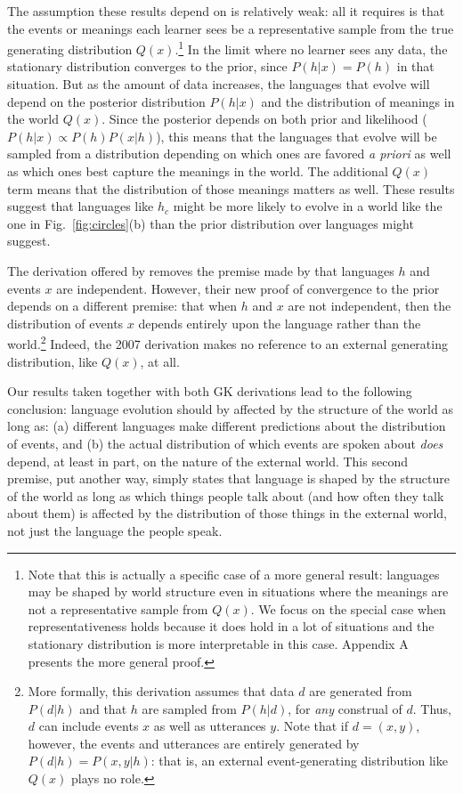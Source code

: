 \documentclass{apa}
\begin{document}
The assumption these results depend on is relatively weak: all it requires is that the events or meanings each learner sees be a representative sample from the true generating distribution $Q(x)$.\footnote{Note that this is actually a specific case of a more general result: languages may be shaped by world structure even in situations where the meanings are not a representative sample from $Q(x)$. We focus on the special case when representativeness holds because it does hold in a lot of situations and the stationary distribution is more interpretable in this case. Appendix A presents the more general proof.} In the limit where no learner sees any data, the stationary distribution converges to the prior, since $P(h | x) = P(h)$ in that situation. But as the amount of data increases, the languages that evolve will depend on the posterior distribution $P(h|x)$ and the distribution of meanings in the world $Q(x)$. Since the posterior depends on both prior and likelihood ($P(h|x) \propto P(h)P(x|h)$), this means that the languages that evolve will be sampled from a distribution depending on which ones are favored {\em a priori} as well as which ones best capture the meanings in the world. The additional $Q(x)$ term means that the distribution of those meanings matters as well. These results suggest that languages like $h_c$ might be more likely to evolve in a world like the one in Fig.~\ref{fig:circles}(b) than the prior distribution over languages might suggest.

The derivation offered by  removes the premise made by  that languages $h$ and events $x$ are independent. However, their new proof of convergence to the prior depends on a different premise: that when $h$ and $x$ are not independent, then the distribution of events $x$ depends entirely upon the language rather than the world.\footnote{More formally, this derivation assumes that data $d$ are generated from $P(d|h)$ and that $h$ are sampled from $P(h|d)$, for {\em any} construal of $d$. Thus, $d$ can include events $x$ as well as utterances $y$. Note that if $d = (x,y)$, however, the events and utterances are entirely generated by $P(d|h) = P(x,y|h)$: that is, an external event-generating distribution like $Q(x)$ plays no role.} Indeed, the 2007 derivation makes no reference to an external generating distribution, like $Q(x)$, at all.

Our results taken together with both GK derivations lead to the following conclusion: language evolution should by affected by the structure of the world as long as: (a) different languages make different predictions about the distribution of events, and (b) the actual distribution of which events are spoken about {\it does} depend, at least in part, on the nature of the external world. This second premise, put another way, simply states that language is shaped by the structure of the world as long as which things people talk about (and how often they talk about them) is affected by the distribution of those things in the external world, not just the language the people speak.
\end{document}
